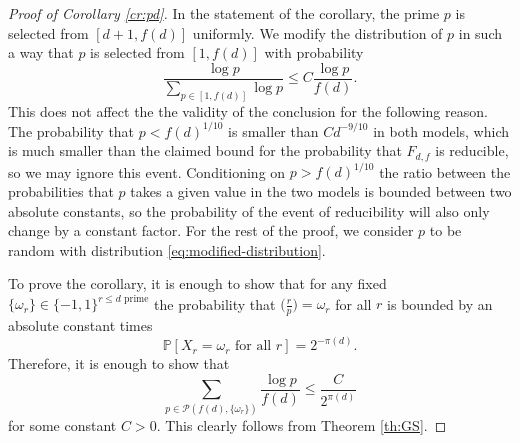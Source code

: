 \documentclass[12pt, notitlepage]{amsart}
\numberwithin{equation}{section}
\def\P{\mathbb P}
\newcommand{\cP}{\mathcal{P}}
\theoremstyle{remark}
\theoremstyle{definition}
\theoremstyle{remark}
\numberwithin{equation}{section}
\begin{document}
\begin{proof}[Proof of Corollary \ref{cr:pd}]
In the statement of the corollary, the prime $p$ is selected from $[d+1,f(d)]$
uniformly.
We modify the distribution of $p$ in such a way that $p$ is selected from
$[1,f(d)]$ with probability
\begin{equation}\label{eq:modified-distribution}
\frac{\log p}{\sum_{p\in[1,f(d)]}\log p}\le C \frac{\log p}{f(d)}.
\end{equation}
This does not affect the the validity of the conclusion for the following reason.
The probability that $p<f(d)^{1/10}$ is smaller than $C d^{-9/10}$ in both models,
which is much smaller than the claimed bound for the probability that $F_{d,f}$ is reducible,
so we may ignore this event.
Conditioning on $p> f(d)^{1/10}$ the ratio between the probabilities that $p$ takes a given value
in the two models is bounded between two absolute constants, so the probability of
the event of reducibility will also only change by a constant factor.
For the rest of the proof, we consider $p$ to be random with distribution \eqref{eq:modified-distribution}.

To prove the corollary, it is enough to show that for any fixed
$\{\omega_r\}\in\{-1,1\}^{\text{$r\le d$ prime}}$ the probability that
$\big(\frac{r}{p}\big)=\omega_r$ for all $r$ is bounded by an absolute
constant times
\[
\P[\text{$X_r=\omega_r$ for all $r$}]=2^{-\pi(d)}.
\]
Therefore, it is enough to show that
\[
\sum_{p\in\cP(f(d),\{\omega_r\})}\frac{\log p}{f(d)} \le \frac{C}{2^{\pi(d)}}
\]
for some constant $C>0$.
This clearly follows from Theorem \ref{th:GS}.
\end{proof}





 
 
	{}
\end{document}
